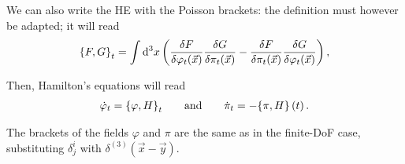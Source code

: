 \documentclass[main.tex]{subfiles}
\begin{document}
We can also write the HE with the Poisson brackets: the definition must however be adapted; it will read 
%
\begin{align}
\qty{F, G}_{t} = \int \dd[3]{x} \qty(\fdv{F}{\varphi_{t}(\vec{x})} \fdv{G}{\pi_{t}(\vec{x})} - \fdv{F}{\pi_{t}(\vec{x})} \fdv{G}{\varphi_{t}(\vec{x})})
\,,
\end{align}
%

Then, Hamilton's equations will read 
%
\begin{align}
\dot{\varphi}_{t} = \qty{\varphi, H}_{t}
\qquad \text{and} \qquad
\dot{\pi}_{t} = -\qty{\pi , H}(t)
\,.
\end{align}

The brackets of the fields \(\varphi \) and \(\pi \) are the same as in the finite-DoF case, substituting \(\delta_{j}^{i}\) with \(\delta^{(3)} (\vec{x}- \vec{y})\).
\end{document}

